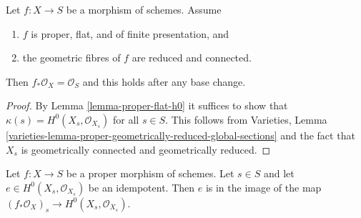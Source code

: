 \begin{lemma}
\label{lemma-proper-flat-geom-red-connected}
Let $f : X \to S$ be a morphism of schemes. Assume
\begin{enumerate}
\item $f$ is proper, flat, and of finite presentation, and
\item the geometric fibres of $f$ are reduced and connected.
\end{enumerate}
Then $f_*\mathcal{O}_X = \mathcal{O}_S$ and this holds
after any base change.
\end{lemma}

\begin{proof}
By Lemma \ref{lemma-proper-flat-h0}
it suffices to show that $\kappa(s) = H^0(X_s, \mathcal{O}_{X_s})$
for all $s \in S$. This follows from
Varieties, Lemma
\ref{varieties-lemma-proper-geometrically-reduced-global-sections}
and the fact that $X_s$ is geometrically connected and geometrically reduced.
\end{proof}

\begin{lemma}
\label{lemma-proper-idempotent-on-fibre}
Let $f : X \to S$ be a proper morphism of schemes. Let $s \in S$
and let $e \in H^0(X_s, \mathcal{O}_{X_s})$ be an idempotent.
Then $e$ is in the image of the map
$(f_*\mathcal{O}_X)_s \to H^0(X_s, \mathcal{O}_{X_s})$.
\end{lemma}

